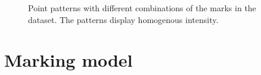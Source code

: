 \documentclass[12pt,a4paper,oneside,article]{memoir}
\begin{document}
\begin{figure}[htb]
  \begin{adjustwidth}{-2in}{-2in}
	  \centering
  \end{adjustwidth}
  \caption{Point patterns with different combinations of the marks in the dataset. The patterns display homogenous intensity.}
  \label{fig:combined_intensities}
\end{figure}

\section{Marking model}
\end{document}
